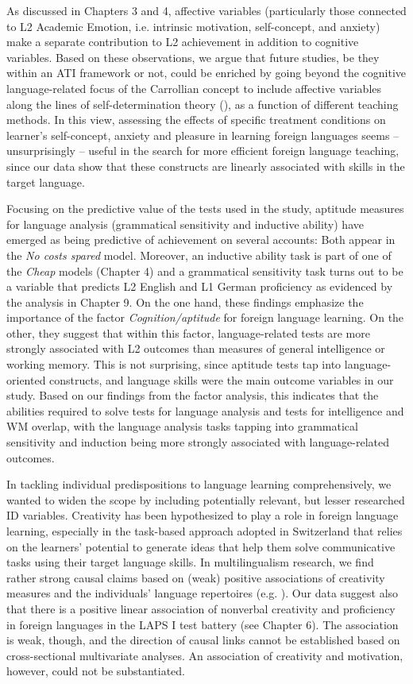 \documentclass[output=paper]{langsci/langscibook}
\begin{document}
As discussed in Chapters 3 and 4, affective variables (particularly those connected to L2 Academic Emotion, i.e. intrinsic motivation, self-concept, and anxiety) make a separate contribution to L2 achievement in addition to cognitive variables. Based on these observations, we argue that future studies, be they within an ATI framework or not, could be enriched by going beyond the cognitive language-related focus of the Carrollian concept to include affective variables along the lines of self-determination theory (\citealt{DeciRyan2002}), as a function of different teaching methods. In this view, assessing the effects of specific treatment conditions on learner’s self-concept, anxiety and pleasure in learning foreign languages seems – unsurprisingly – useful in the search for more efficient foreign language teaching, since our data show that these constructs are linearly associated with skills in the target language. 

Focusing on the predictive value of the tests used in the study, aptitude measures for language analysis (grammatical sensitivity and inductive ability) have emerged as being predictive of achievement on several accounts: Both appear in the \textit{No costs spared} model. Moreover, an inductive ability task is part of one of the \textit{Cheap} models (Chapter 4) and a grammatical sensitivity task turns out to be a variable that predicts L2 English and L1 German proficiency as evidenced by the analysis in Chapter 9. On the one hand, these findings emphasize the importance of the factor \textit{Cognition/aptitude} for foreign language learning. On the other, they suggest that within this factor, language-related tests are more strongly associated with L2 outcomes than measures of general intelligence or working memory. This is not surprising, since aptitude tests tap into language-oriented constructs, and language skills were the main outcome variables in our study. Based on our findings from the factor analysis, this indicates that the abilities required to solve tests for language analysis and tests for intelligence and WM overlap, with the language analysis tasks tapping into grammatical sensitivity and induction being more strongly associated with language-related outcomes. 

In tackling individual predispositions to language learning comprehensively, we wanted to widen the scope by including potentially relevant, but lesser researched ID variables. Creativity has been hypothesized to play a role in foreign language learning, especially in the task-based approach adopted in Switzerland that relies on the learners’ potential to generate ideas that help them solve communicative tasks using their target language skills. In multilingualism research, we find rather strong causal claims based on (weak) positive associations of creativity measures and the individuals’ language repertoires (e.g. \citealt{FuerstGrin2018}). Our data suggest also that there is a positive linear association of nonverbal creativity and proficiency in foreign languages in the LAPS I test battery (see Chapter 6). The association is weak, though, and the direction of causal links cannot be established based on cross-sectional multivariate analyses. An association of creativity and motivation, however, could not be substantiated. 
\end{document}

